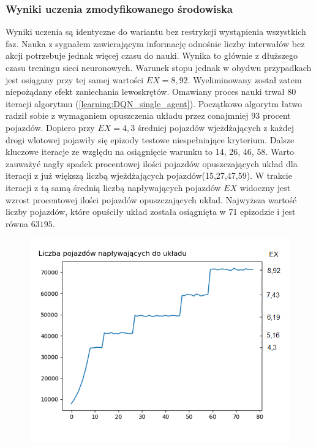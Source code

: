 \documentclass[12pt]{book}
\theoremstyle{plain}
\newcommand{\myref}[1]{(\ref{#1})}
\begin{document}
\subsubsection*{Wyniki uczenia zmodyfikowanego środowiska}
Wyniki uczenia są identyczne do wariantu bez restrykcji wystąpienia wszystkich faz. Nauka z sygnałem zawierającym informację odnośnie liczby interwałów bez akcji potrzebuje jednak więcej czasu do nauki. Wynika to głównie z dłuższego czasu treningu sieci neuronowych. Warunek stopu jednak w obydwu przypadkach jest osiągany przy tej samej wartości $EX=8,92$. Wyeliminowany został zatem niepożądany efekt zaniechania lewoskrętów. Omawiany proces nauki trwał 80 iteracji algorytmu \myref{learning:DQN_single_agent}. Początkowo algorytm łatwo radził sobie z wymaganiem opuszczenia układu przez conajmniej 93 procent pojazdów. Dopiero przy $EX=4,3$ średniej pojazdów wjeżdżających z każdej drogi wlotowej pojawiły się epizody testowe niespełniające  kryterium. Dalsze kluczowe iteracje ze względu na osiągnięcie warunku to 14, 26, 46, 58. Warto zauważyć nagły spadek procentowej ilości pojazdów opuszczających układ dla iteracji z już większą liczbą wjeżdżających pojazdów(15,27,47,59). W trakcie iteracji z tą samą średnią liczbą napływających pojazdów $EX$ widoczny jest wzrost procentowej ilości pojazdów opuszczających układ. Najwyższa wartość liczby pojazdów, które opuściły układ została osiągnięta w 71 epizodzie i jest równa $63 195$.
\begin{figure}[H]
	\centering
	\includegraphics[width=14cm]{images/poli_wyniki/plot_cars_in}
	\label{fig:env_poli_in}
	\centering
\end{figure} \noindent
\end{document}
